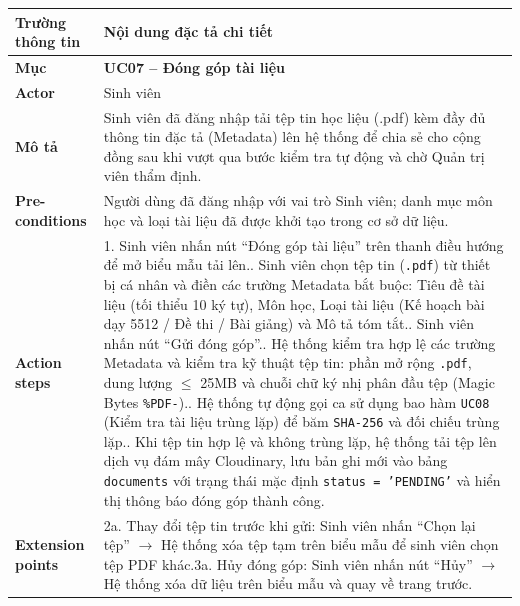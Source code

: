 \begin{table}[H]
\centering
\footnotesize\linespread{1.05}\selectfont
\setlength{\tabcolsep}{5pt}
\renewcommand{\arraystretch}{1.12}
\begin{tabularx}{\textwidth}{|p{3.5cm}|X|}
\hline
\rowcolor[HTML]{EAEAEA}
\textbf{Trường thông tin} & \textbf{Nội dung đặc tả chi tiết} \\
\hline
\textbf{Mục} & \textbf{UC07 -- Đóng góp tài liệu} \\
\hline
\textbf{Actor} & Sinh viên \\
\hline
\textbf{Mô tả} & Sinh viên đã đăng nhập tải tệp tin học liệu (.pdf) kèm đầy đủ thông tin đặc tả (Metadata) lên hệ thống để chia sẻ cho cộng đồng sau khi vượt qua bước kiểm tra tự động và chờ Quản trị viên thẩm định. \\
\hline
\textbf{Pre-conditions} & Người dùng đã đăng nhập với vai trò Sinh viên; danh mục môn học và loại tài liệu đã được khởi tạo trong cơ sở dữ liệu. \\
\hline
\textbf{Action steps} & 1. Sinh viên nhấn nút ``Đóng góp tài liệu'' trên thanh điều hướng để mở biểu mẫu tải lên.\newline 2. Sinh viên chọn tệp tin (\texttt{.pdf}) từ thiết bị cá nhân và điền các trường Metadata bắt buộc: Tiêu đề tài liệu (tối thiểu 10 ký tự), Môn học, Loại tài liệu (Kế hoạch bài dạy 5512 / Đề thi / Bài giảng) và Mô tả tóm tắt.\newline 3. Sinh viên nhấn nút ``Gửi đóng góp''.\newline 4. Hệ thống kiểm tra hợp lệ các trường Metadata và kiểm tra kỹ thuật tệp tin: phần mở rộng \texttt{.pdf}, dung lượng $\le$ 25MB và chuỗi chữ ký nhị phân đầu tệp (Magic Bytes \texttt{\%PDF-}).\newline 5. Hệ thống tự động gọi ca sử dụng bao hàm \texttt{UC08} (Kiểm tra tài liệu trùng lặp) để băm \texttt{SHA-256} và đối chiếu trùng lặp.\newline 6. Khi tệp tin hợp lệ và không trùng lặp, hệ thống tải tệp lên dịch vụ đám mây Cloudinary, lưu bản ghi mới vào bảng \texttt{documents} với trạng thái mặc định \texttt{status = 'PENDING'} và hiển thị thông báo đóng góp thành công. \\
\hline
\textbf{Extension points} & 2a. Thay đổi tệp tin trước khi gửi: Sinh viên nhấn ``Chọn lại tệp'' $\rightarrow$ Hệ thống xóa tệp tạm trên biểu mẫu để sinh viên chọn tệp PDF khác.\newline 3a. Hủy đóng góp: Sinh viên nhấn nút ``Hủy'' $\rightarrow$ Hệ thống xóa dữ liệu trên biểu mẫu và quay về trang trước. \\

\end{tabularx}
\end{table}
